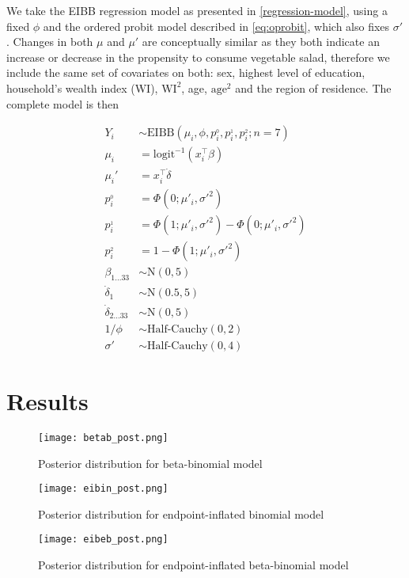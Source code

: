 We take the EIBB regression model as presented in \ref{regression-model}, using a fixed $\phi$ and the ordered probit model described in \ref{eq:oprobit}, which also fixes $\sigma'$. Changes in both $\mu$ and $\mu'$ are conceptually similar as they both indicate an increase or decrease in the propensity to consume vegetable salad, therefore we include the same set of covariates on both: sex, highest level of education, household's wealth index (WI), $\text{WI}^2$, age, $\text{age}^2$ and the region of residence. The complete model is then

\begin{equation}
\begin{split}
Y_{i} &\sim \mathrm{EIBB}(\mu_i, \phi, p^{_0}_{i}, p^{_1}_{i}, p^{_2}_{i}; n = 7) \\
\mu_{i} &= \text{logit}^{-1}\left( x_{i}^\top \beta \right) \\
\mu_{i}' &= x_{i}^{\top} \dot{\delta} \\
p^{_0}_i &= \Phi(0;\mu'_{i},\sigma'^{2}) \\
p^{_1}_i &= \Phi(1;\mu'_{i},\sigma'^{2}) - \Phi(0;\mu'_{i},\sigma'^{2})\\
p^{_2}_i &= 1 - \Phi(1;\mu'_{i},\sigma'^{2})\\
\beta_{1 ... 33} &\sim \text{N}(0, 5)\\
\dot{\delta}_1 &\sim \text{N}(0.5, 5)\\
\dot{\delta}_{2 ... 33} &\sim \text{N}(0, 5)\\
1/\phi &\sim \text{Half-Cauchy}(0, 2)\\
\sigma' &\sim \text{Half-Cauchy}(0, 4)
\end{split}
\end{equation}

\section{Results}
\label{sec:applications-results}

\begin{figure}
  \texttt{[image: betab\_post.png]}
  \caption{Posterior distribution for beta-binomial model}
  \label{fig:post-betab}
\end{figure}

\begin{figure}
  \texttt{[image: eibin\_post.png]}
  \caption{Posterior distribution for endpoint-inflated binomial model}
  \label{fig:post-eibin}
\end{figure}

\begin{figure}
  \texttt{[image: eibeb\_post.png]}
  \caption{Posterior distribution for endpoint-inflated beta-binomial model}
  \label{fig:post-eibeb}
\end{figure}

